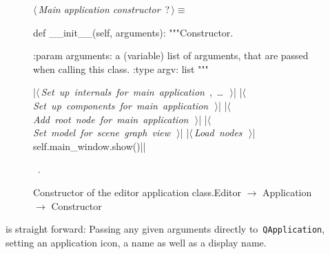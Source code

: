 \documentclass[%
    a4paper,    %
    justified,  %
    nobib,      %
    openany     %
]{tufte-book}
\begin{document}
\begin{figure}[h]
\begin{flushleft} \small
\begin{minipage}{\linewidth}\label{scrap13}\raggedright\small
{} $\langle\,${\itshape Main application constructor}\nobreak\ {\footnotesize {?}}$\,\rangle\equiv$
\vspace{-1ex}
\begin{pythoncode}
def __init__(self, arguments):
    """Constructor.

    :param arguments: a (variable) list of arguments, that are
                      passed when calling this class.
    :type  argv:      list
    """

    |\hbox{$\langle\,${\itshape Set up internals for main application}\nobreak\ {\footnotesize {}, \ldots\ }$\,\rangle$}|
    |\hbox{$\langle\,${\itshape Set up components for main application}\nobreak\ {\footnotesize {}}$\,\rangle$}|
    |\hbox{$\langle\,${\itshape Add root node for main application}\nobreak\ {\footnotesize {}}$\,\rangle$}|
    |\hbox{$\langle\,${\itshape Set model for scene graph view}\nobreak\ {\footnotesize {}}$\,\rangle$}|
    |\hbox{$\langle\,${\itshape Load nodes}\nobreak\ {\footnotesize {}}$\,\rangle$}|
    self.main_window.show()|\NWsep|
\end{pythoncode}
\vspace{1.5ex}
\footnotesize
\begin{list}{}{\setlength{\itemsep}{-\parsep}\setlength{\itemindent}{-\leftmargin}}
\item \NWtxtMacroRefIn\ .

\item{}
\end{list}
\end{minipage}\vspace{4ex}
\end{flushleft}
\caption{Constructor of the editor application
    class.\newline{}\newline{}Editor $\rightarrow$ Application $\rightarrow$
    Constructor} \label{editor:lst:app:constructor}
\end{figure}

 is straight forward: Passing any given
arguments directly to~\verb=QApplication=, setting an application icon, a name
as well as a display name.
\end{document}
